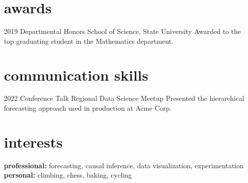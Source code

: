 \documentclass[]{friggeri-cv-a4}
\begin{document}

\section{awards}

\begin{entrylist}


\entry
{2019}
{Departmental Honors}
{School of Science, State University}
{Awarded to the top graduating student in the Mathematics department.}


\end{entrylist}


\section{communication skills}

\begin{entrylist}


\entry
{2022}
{Conference Talk}
{Regional Data Science Meetup}
{Presented the hierarchical forecasting approach used in production at Acme Corp.}


\end{entrylist}


\section{interests}

\textbf{professional:} forecasting, causal inference, data visualization, experimentation \textbf{personal:} climbing, chess, baking, cycling
\end{document}
